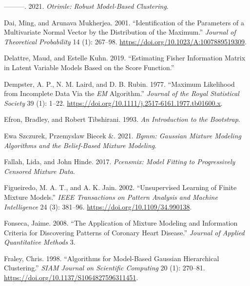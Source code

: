 \begin{CSLReferences}{1}{0}
\leavevmode{}%
---------. 2021. \emph{Otrimle: Robust Model-Based Clustering}.

\leavevmode{}%
Dai, Ming, and Arunava Mukherjea. 2001. {``Identification of the {Parameters} of a {Multivariate Normal Vector} by the {Distribution} of the {Maximum}.''} \emph{Journal of Theoretical Probability} 14 (1): 267--98. \url{https://doi.org/10.1023/A:1007889519309}.

\leavevmode{}%
Delattre, Maud, and Estelle Kuhn. 2019. {``Estimating {Fisher Information Matrix} in {Latent Variable Models} Based on the {Score Function}.''}

\leavevmode{}%
Dempster, A. P., N. M. Laird, and D. B. Rubin. 1977. {``Maximum {Likelihood} from {Incomplete Data Via} the {\emph{EM}} {Algorithm}.''} \emph{Journal of the Royal Statistical Society} 39 (1): 1--22. \url{https://doi.org/10.1111/j.2517-6161.1977.tb01600.x}.

\leavevmode{}%
Efron, Bradley, and Robert Tibshirani. 1993. \emph{An {Introduction} to the {Bootstrap}}.

\leavevmode{}%
Ewa Szczurek, Przemyslaw Biecek \&. 2021. \emph{Bgmm: Gaussian Mixture Modeling Algorithms and the Belief-Based Mixture Modeling}.

\leavevmode{}%
Fallah, Lida, and John Hinde. 2017. \emph{Pcensmix: Model Fitting to Progressively Censored Mixture Data}.

\leavevmode{}%
Figueiredo, M. A. T., and A. K. Jain. 2002. {``Unsupervised Learning of Finite Mixture Models.''} \emph{IEEE Transactions on Pattern Analysis and Machine Intelligence} 24 (3): 381--96. \url{https://doi.org/10.1109/34.990138}.

\leavevmode{}%
Fonseca, Jaime. 2008. {``The Application of Mixture Modeling and Information Criteria for Discovering Patterns of Coronary Heart Disease.''} \emph{Journal of Applied Quantitative Methods} 3.

\leavevmode{}%
Fraley, Chris. 1998. {``Algorithms for {Model-Based Gaussian Hierarchical Clustering}.''} \emph{SIAM Journal on Scientific Computing} 20 (1): 270--81. \url{https://doi.org/10.1137/S1064827596311451}.


\end{CSLReferences}

